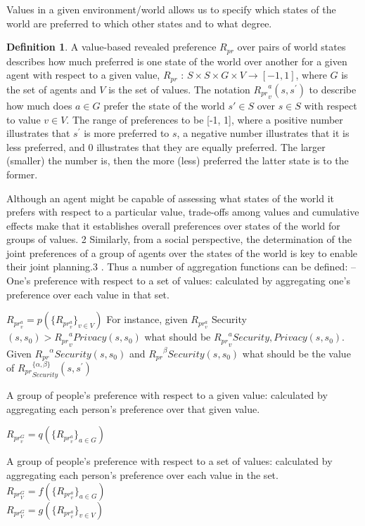 \documentclass{article}
\theoremstyle{definition}
\newtheorem{definition}{Definition}
\theoremstyle{remark}
\begin{document}
Values in a given environment/world allows us to specify which states of the world are preferred to which other states and to what degree.  

\begin{definition}
A value-based revealed preference \textit{$R_{pr}$} over pairs of world states describes how much preferred is one state of the world over another for a given agent with respect to a given value, \textit{$R_{pr}$} : $S \times S \times G \times V \longrightarrow [-1, 1]$, where $G$ is the set of agents and $V$ is the set of values. The notation ${R_{pr}}_{v}^{a} (s, s^\prime)$ to describe how much does $a \in G$ prefer the state of the world $s' \in S$ over $s \in S$ with respect to value $v \in V$.
The range of preferences to be [-1, 1], where a positive number illustrates that $s^\prime$ is more preferred to $s$, a negative number illustrates that it is less preferred, and 0 illustrates that they are equally preferred. The larger (smaller) the number is, then the more (less) preferred the latter state is to the former.
\end{definition}


Although an agent might be capable of assessing what states of the world it
prefers with respect to a particular value, trade-offs among values and cumulative
effects make that it establishes overall preferences over states of the world for
groups of values.
2 Similarly, from a social perspective, the determination of the
joint preferences of a group of agents over the states of the world is key to enable
their joint planning.3
. Thus a number of aggregation functions can be defined:
– One’s preference with respect to a set of values: calculated by aggregating
one’s preference over each value in that set.

$R_{pr}_{v}^{a} = p(\{R_{pr}_{v}^{a}\}_{v \in V})$
For instance, given $R_{pr}_{v}^{a}$
Security $(s, s_0) > {R_{pr}}_{v}^{a} Privacy(s, s_0)$ what should be ${R_{pr}}_{v}^{a} {Security, Privacy}
(s, s_0)$. Given ${R_{pr}}^\alpha Security(s, s_0)$ and ${R_{pr}}^\beta Security(s, s_0)$ what should be the value of
${R_{pr}}_{Security}^{\{\alpha, \beta\}}(s, s^\prime)$

A group of people’s preference with respect to a given value: calculated by
aggregating each person’s preference over that given value.

$R_{pr}_{v}^{G} = q(\{R_{pr}_{v}^{a}\}_{a \in G})$

A group of people’s preference with respect to a set of values: calculated by aggregating each person’s preference over each value in the set.\\
$R_{pr}_{V}^{G} = f(\{R_{pr}_{v}^{a}\}_{a \in G})$\\
$R_{pr}_{V}^{G} = g(\{R_{pr}_{v}^{a}\}_{v \in V})$\\
\end{document}

